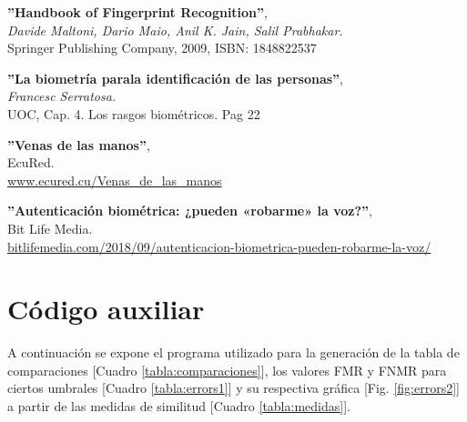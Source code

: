 \documentclass[10pt,a4paper]{article}
\begin{document}
\begin{thebibliography}{9}

	\textbf{''Handbook of Fingerprint Recognition''}, \\
	\textit{Davide Maltoni, Dario Maio, Anil K. Jain, Salil Prabhakar.} \\
	Springer Publishing Company, 2009, ISBN: 1848822537
  
  \textbf{''La biometría parala identificación de las personas''}, \\
  \textit{Francesc Serratosa.}\\
  UOC, Cap. 4. Los rasgos biométricos. Pag 22
  
  \textbf{''Venas de las manos''}, \\
  EcuRed.\\
  \href{https://www.ecured.cu/Venas_de_las_manos}{www.ecured.cu/Venas\_de\_las\_manos}
  
  \textbf{''Autenticación biométrica: ¿pueden «robarme» la voz?''}, \\
  Bit Life Media.\\
  \href{https://bitlifemedia.com/2018/09/autenticacion-biometrica-pueden-robarme-la-voz/}{bitlifemedia.com/2018/09/autenticacion-biometrica-pueden-robarme-la-voz/}

\end{thebibliography}

\pagebreak

\appendix
\section{Código auxiliar}
\label{appendix:help}
A continuación se expone el programa utilizado para la generación de la tabla de comparaciones [Cuadro \ref{tabla:comparaciones}],  los valores FMR y FNMR para ciertos umbrales [Cuadro \ref{tabla:errors1}] y su respectiva gráfica [Fig. \ref{fig:errors2}] a partir de las medidas de similitud [Cuadro \ref{tabla:medidas}].

\end{document}
